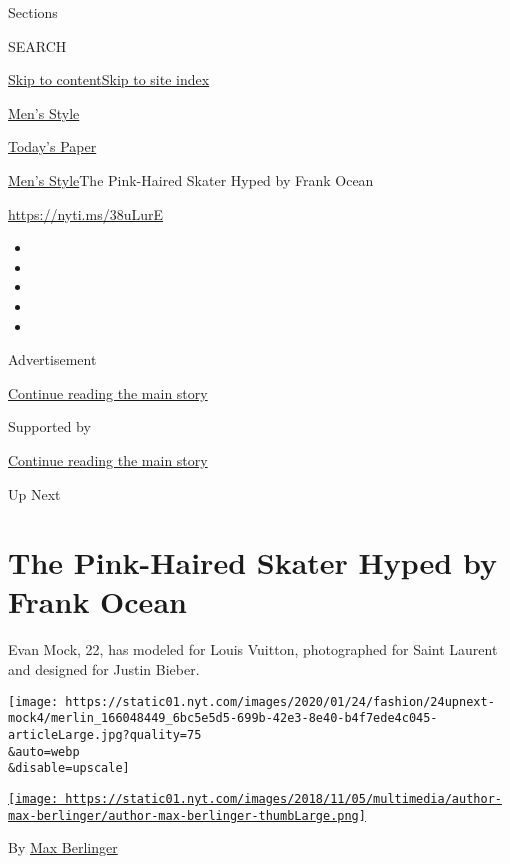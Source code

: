 Sections

SEARCH

\protect\hyperlink{site-content}{Skip to
content}\protect\hyperlink{site-index}{Skip to site index}

\href{https://www.nytimes.com/section/fashion/mens-style}{Men's Style}

\href{https://myaccount.nytimes.com/auth/login?response_type=cookie\&client_id=vi}{}

\href{https://www.nytimes.com/section/todayspaper}{Today's Paper}

\href{/section/fashion/mens-style}{Men's Style}\textbar{}The Pink-Haired
Skater Hyped by Frank Ocean

\href{https://nyti.ms/38uLurE}{https://nyti.ms/38uLurE}

\begin{itemize}
\item
\item
\item
\item
\item
\end{itemize}

Advertisement

\protect\hyperlink{after-top}{Continue reading the main story}

Supported by

\protect\hyperlink{after-sponsor}{Continue reading the main story}

Up Next

\hypertarget{the-pink-haired-skater-hyped-by-frank-ocean}{%
\section{The Pink-Haired Skater Hyped by Frank
Ocean}\label{the-pink-haired-skater-hyped-by-frank-ocean}}

Evan Mock, 22, has modeled for Louis Vuitton, photographed for Saint
Laurent and designed for Justin Bieber.

\texttt{[image: https://static01.nyt.com/images/2020/01/24/fashion/24upnext-mock4/merlin\_166048449\_6bc5e5d5-699b-42e3-8e40-b4f7ede4c045-articleLarge.jpg?quality=75\\\&auto=webp\\\&disable=upscale]}

\href{https://www.nytimes.com/by/max-berlinger}{\texttt{[image: https://static01.nyt.com/images/2018/11/05/multimedia/author-max-berlinger/author-max-berlinger-thumbLarge.png]}}

By \href{https://www.nytimes.com/by/max-berlinger}{Max Berlinger}

